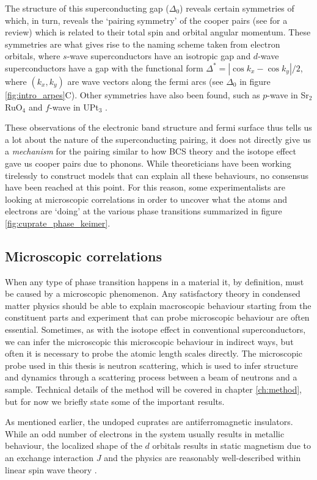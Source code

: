The structure of this superconducting gap ($\Delta_0$) reveals certain symmetries of which, in turn, reveals the `pairing symmetry' of the cooper pairs (see \cite{Tsuei2000} for a review) which is related to their total spin and orbital angular momentum. These symmetries are what gives rise to the naming scheme taken from electron orbitals, where $s$-wave superconductors have an isotropic gap and $d$-wave superconductors have a gap with the functional form $\Delta^* = | \cos k_x - \cos k_y | / 2$, where $(k_x, k_y)$ are wave vectors along the fermi arcs (see $\Delta_0$ in figure \ref{fig:intro_arpes}C). Other symmetries have also been found, such as $p$-wave in Sr$_2$RuO$_4$ \cite{Mackenzie2003} and $f$-wave in UPt$_3$ \cite{Joynt2002}.

These observations of the electronic band structure and fermi surface thus tells us a lot about the nature of the superconducting pairing, it does not directly give us a \emph{mechanism} for the pairing similar to how BCS theory and the isotope effect gave us cooper pairs due to phonons. While theoreticians have been working tirelessly to construct models that can explain all these behaviours, no consensus have been reached at this point. For this reason, some experimentalists are looking at microscopic correlations in order to uncover what the atoms and electrons are `doing' at the various phase transitions summarized in figure \ref{fig:cuprate_phase_keimer}.

\subsection{Microscopic correlations}
When any type of phase transition happens in a material it, by definition, must be caused by a microscopic phenomenon. Any satisfactory theory in condensed matter physics should be able to explain macroscopic behaviour starting from the constituent parts and experiment that can probe microscopic behaviour are often essential. Sometimes, as with the isotope effect in conventional superconductors, we can infer the microscopic this microscopic behaviour in indirect ways, but often it is necessary to probe the atomic length scales directly. The microscopic probe used in this thesis is neutron scattering, which is used to infer structure and dynamics through a scattering process between a beam of neutrons and a sample. Technical details of the method will be covered in chapter \ref{ch:method}, but for now we briefly state some of the important results.

As mentioned earlier, the undoped cuprates are antiferromagnetic insulators. While an odd number of electrons in the system usually results in metallic behaviour, the localized shape of the $d$ orbitals results in static magnetism due to an exchange interaction $J$ and the physics are reasonably well-described within linear spin wave theory \cite{Headings2010}.

